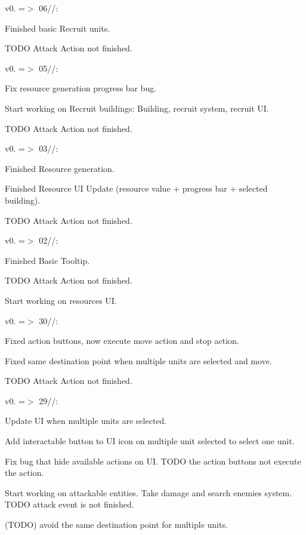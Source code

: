 v0. =\texorpdfstring{$>$}{>} 06//:\+
\begin{DoxyItemize}
\item Finished basic Recruit units.
\item TODO Attack Action not finished.
\end{DoxyItemize}

v0. =\texorpdfstring{$>$}{>} 05//:\+
\begin{DoxyItemize}
\item Fix resource generation progress bar bug.
\item Start working on Recruit buildings:\+ Building, recruit system, recruit UI.
\item TODO Attack Action not finished.
\end{DoxyItemize}

v0. =\texorpdfstring{$>$}{>} 03//:\+
\begin{DoxyItemize}
\item Finished Resource generation.
\item Finished Resource UI Update (resource value + progress bar + selected building).
\item TODO Attack Action not finished.
\end{DoxyItemize}

v0. =\texorpdfstring{$>$}{>} 02//:\+
\begin{DoxyItemize}
\item Finished Basic Tooltip.
\item TODO Attack Action not finished.
\item Start working on resources UI.
\end{DoxyItemize}

v0. =\texorpdfstring{$>$}{>} 30//:\+
\begin{DoxyItemize}
\item Fixed action buttons, now execute move action and stop action.
\item Fixed same destination point when multiple units are selected and move.
\item TODO Attack Action not finished.
\end{DoxyItemize}

v0. =\texorpdfstring{$>$}{>} 29//:\+
\begin{DoxyItemize}
\item Update UI when multiple units are selected.
\item Add interactable button to UI icon on multiple unit selected to select one unit.
\item Fix bug that hide available actions on UI. TODO the action buttons not execute the action.
\item Start working on attackable entities. Take damage and search enemies system. TODO attack event is not finished.
\item (TODO) avoid the same destination point for multiple units.
\end{DoxyItemize}

